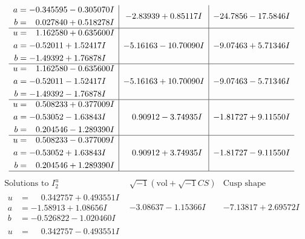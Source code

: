 \documentclass[1p]{elsarticle_modified}
\theoremstyle{definition}
\newcommand{\I}{\sqrt{-1}}
\begin{document}
$$\begin{array}{c|c|c}
\begin{aligned}
a &= -0.345595 - 0.305070 I \\
b &= \phantom{-}0.027840 + 0.518278 I\end{aligned}
 & -2.83939 + 0.85117 I & -24.7856 - 17.5846 I \\ \hline\begin{aligned}
u &= \phantom{-}1.162580 + 0.635600 I \\
a &= -0.52011 + 1.52417 I \\
b &= -1.49392 + 1.76878 I\end{aligned}
 & -5.16163 - 10.70090 I & -9.07463 + 5.71346 I \\ \hline\begin{aligned}
u &= \phantom{-}1.162580 - 0.635600 I \\
a &= -0.52011 - 1.52417 I \\
b &= -1.49392 - 1.76878 I\end{aligned}
 & -5.16163 + 10.70090 I & -9.07463 - 5.71346 I \\ \hline\begin{aligned}
u &= \phantom{-}0.508233 + 0.377009 I \\
a &= -0.53052 - 1.63843 I \\
b &= \phantom{-}0.204546 - 1.289390 I\end{aligned}
 & \phantom{-}0.90912 - 3.74935 I & -1.81727 + 9.11550 I \\ \hline\begin{aligned}
u &= \phantom{-}0.508233 - 0.377009 I \\
a &= -0.53052 + 1.63843 I \\
b &= \phantom{-}0.204546 + 1.289390 I\end{aligned}
 & \phantom{-}0.90912 + 3.74935 I & -1.81727 - 9.11550 I\\
 \hline 
 \end{array}$$\newpage$$\begin{array}{c|c|c}  
\text{Solutions to }I^u_{2}& \I (\text{vol} + \sqrt{-1}CS) & \text{Cusp shape}\\
 \hline 
\begin{aligned}
u &= \phantom{-}0.342757 + 0.493551 I \\
a &= -1.58913 + 1.08656 I \\
b &= -0.526822 - 1.020460 I\end{aligned}
 & -3.08637 - 1.15366 I & -7.13817 + 2.69572 I \\ \hline\begin{aligned}
u &= \phantom{-}0.342757 - 0.493551 I \\

\end{aligned}
\end{array}$$
\end{document}

